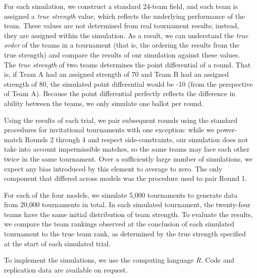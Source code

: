 \documentclass{tufte-handout}
\begin{document}
For each simulation, we construct a standard 24-team field, and each team is assigned a \emph{true strength} value, which reflects the underlying performance of the team. These values are not determined from real tournament results; instead, they are assigned within the simulation. As a result, we can understand the \emph{true order} of the teams in a tournament (that is, the ordering the results from the true strength) and compare the results of our simulation against these values. The \emph{true strength} of two teams determines the point differential of a round. That is, if Team A had an assigned strength of 70 and Team B had an assigned strength of 80, the simulated point differential would be -10 (from the perspective of Team A). Because the point differential perfectly reflects the difference in ability between the teams, we only simulate one ballot per round.

Using the results of each trial, we pair subsequent rounds using the standard procedures for invitational tournaments with one exception: while we power-match Rounds 2 through 4 and respect side-constraints, our simulation does not take into account impermissible matches, so the same teams may face each other twice in the same tournament. Over a sufficiently large number of simulations, we expect any bias introduced by this element to average to zero. The only component that differed across models was the procedure used to pair Round 1.

For each of the four models, we simulate 5,000 tournaments to generate data from 20,000 tournaments in total. In each simulated tournament, the twenty-four teams have the same initial distribution of team strength. To evaluate the results, we compare the team rankings observed at the conclusion of each simulated tournament to the true team rank, as determined by the true strength specified at the start of each simulated trial. 

To implement the simulations, we use the computing language \emph{R}. Code and replication data are available on request.
\end{document}
